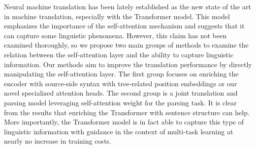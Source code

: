 \documentclass[12pt]{article}
\begin{document}
Neural machine translation has been lately established as the new state of the art in machine translation, especially with the Transformer model. This model emphasizes the importance of the self-attention mechanism and suggests that it can capture some linguistic phenomena. However, this claim has not been examined thoroughly, so we propose two main groups of methods to examine the relation between the self-attention layer and the ability to capture linguistic information. Our methods aim to improve the translation performance by directly manipulating the self-attention layer. The first group focuses on enriching the encoder with source-side syntax with tree-related position embeddings or our novel specialized attention heads. The second group is a joint translation and parsing model leveraging self-attention weight for the parsing task. It is clear from the results that enriching the Transformer with sentence structure can help. More importantly, the Transformer model is in fact able to capture this type of linguistic information with guidance in the context of multi-task learning at nearly no increase in training costs.
\end{document}
